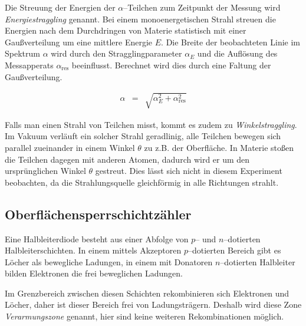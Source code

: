 \documentclass[12pt,a4paper]{scrartcl}
\numberwithin{equation}{section} %
\begin{document}
\noindent
Die Streuung der Energien der $\alpha$--Teilchen zum Zeitpunkt der Messung wird \emph{Energiestraggling} genannt. Bei einem monoenergetischen Strahl streuen die Energien nach dem Durchdringen von Materie statistisch mit einer Gaußverteilung um eine mittlere Energie $E$. Die Breite der beobachteten Linie im Spektrum $\alpha$ wird durch den Stragglingparameter $\alpha_E$ und die Auflösung des Messapperats $\alpha_\mathrm{res}$ beeinflusst. Berechnet wird dies durch eine Faltung der Gaußverteilung.

\begin{eqnarray}
    \alpha &=& \sqrt{\alpha_E^2 + \alpha_\mathrm{res}^2} \label{eq:straggling parameter}
\end{eqnarray}

\noindent
Falls man einen Strahl von Teilchen misst, kommt es zudem zu \emph{Winkelstraggling}. Im Vakuum verläuft ein solcher Strahl geradlinig, alle Teilchen bewegen sich parallel zueinander in einem Winkel $\theta$ zu z.B. der Oberfläche. In Materie stoßen die Teilchen dagegen mit anderen Atomen, dadurch wird er um den ursprünglichen Winkel $\theta$ gestreut. Dies lässt sich nicht in diesem Experiment beobachten, da die Strahlungsquelle gleichförmig in alle Richtungen strahlt.

\hypertarget{oberfluxe4chensperrschichtzuxe4hler}{%
\subsection{Oberflächensperrschichtzähler}\label{oberfluxe4chensperrschichtzuxe4hler}}

Eine Halbleiterdiode besteht aus einer Abfolge von $p$-- und $n$--dotierten Halbleiterschichten. In einem mittels Akzeptoren $p$--dotierten Bereich gibt es Löcher als bewegliche Ladungen, in einem mit Donatoren $n$--dotierten Halbleiter bilden Elektronen die frei beweglichen Ladungen.

Im Grenzbereich zwischen diesen Schichten rekombinieren sich Elektronen und Löcher, daher ist dieser Bereich frei von Ladungsträgern. Deshalb wird diese Zone \emph{Verarmungszone} genannt, hier sind keine weiteren Rekombinationen möglich.
\end{document}
